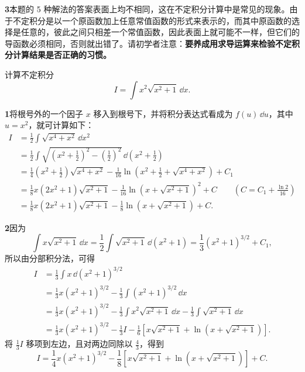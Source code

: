 \begin{xremark}
\textbf{3}\quad 本题的 5 种解法的答案表面上均不相同，这在不定积分计算中是常见的现象。由于不定积分是以一个原函数加上任意常值函数的形式来表示的，而其中原函数的选择是任意的，彼此之间只相差一个常值函数，因此表面上就可能不一样，但它们的导函数必须相同，否则就出错了。请初学者注意：\textbf{要养成用求导运算来检验不定积分计算结果是否正确的习惯。}
\end{xremark}

\begin{xexample}[9.1.2]
计算不定积分
\[
  I=\int x^2\sqrt{x^2+1}\,\dd x.
\]
\end{xexample}

\begin{xsolution}
\textbf{1}\quad 将根号外的一个因子 $x$ 移入到根号下，并将积分表达式看成为 $f(u)\,\dd u$，其中 $u=x^2$，就可计算如下：
\begin{align*}
  I
  &=\frac12\int\sqrt{x^4+x^2}\,\dd x^2\\
  &=\frac12\int\sqrt{\left(x^2+\frac12\right)^2-\left(\frac12\right)^2}\,\dd\left(x^2+\frac12\right)\\
  &=\frac14\left(x^2+\frac12\right)\sqrt{x^4+x^2}
    -\frac1{16}\ln\left(x^2+\frac12+\sqrt{x^4+x^2}\right)+C_1\\
  &=\frac18x(2x^2+1)\sqrt{x^2+1}
    -\frac1{16}\ln\left(x+\sqrt{x^2+1}\right)^2+C
    \qquad\left(C=C_1+\frac{\ln2}{16}\right)\\
  &=\frac18x(2x^2+1)\sqrt{x^2+1}
    -\frac18\ln\left(x+\sqrt{x^2+1}\right)+C.
\end{align*}
\end{xsolution}

\begin{xsolution}
\textbf{2}\quad 因为
\[
  \int x\sqrt{x^2+1}\,\dd x
    =\frac12\int\sqrt{x^2+1}\,\dd(x^2+1)
    =\frac13(x^2+1)^{3/2}+C_1,
\]
所以由分部积分法，可得
\begin{align*}
  I
  &=\frac13\int x\,\dd(x^2+1)^{3/2}\\
  &=\frac13x(x^2+1)^{3/2}-\frac13\int(x^2+1)^{3/2}\,\dd x\\
  &=\frac13x(x^2+1)^{3/2}-\frac13\int x^2\sqrt{x^2+1}\,\dd x
    -\frac13\int\sqrt{x^2+1}\,\dd x\\
  &=\frac13x(x^2+1)^{3/2}-\frac13I
    -\frac16\left[x\sqrt{x^2+1}+\ln\left(x+\sqrt{x^2+1}\right)\right].
\end{align*}
将 $\frac13I$ 移项到左边，且对两边同除以 $\frac43$，得到
\[
  I=\frac14x(x^2+1)^{3/2}
    -\frac18\left[x\sqrt{x^2+1}+\ln\left(x+\sqrt{x^2+1}\right)\right]+C.
\]
\end{xsolution}

